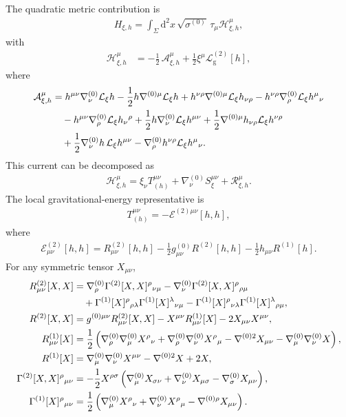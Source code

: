 \documentclass[11pt]{article}
\newcommand{\dd}{\mathrm{d}}
\newcommand{\Lg}{\mathcal{L}_{\mathrm g}}
\newcommand{\cH}{\mathcal{H}}
\newcommand{\cE}{\mathcal{E}}
\newcommand{\cR}{\mathcal{R}}
\newcommand{\Lie}{\mathcal{L}}
\begin{document}
The quadratic metric contribution is
\begin{align}
  H_{\xi,h}
  =\int_\Sigma\dd^2x\,\sqrt{\sigma^{(0)}}\,
    \tau_\mu\cH^\mu_{\xi,h},
\end{align}
with
\begin{align}
  \cH^\mu_{\xi,h}
  &=-\frac12\,\mathcal{A}^\mu_{\xi,h}
    +\frac12\xi^\mu\Lg^{(2)}[h],
\end{align}
where
\begin{align}
  \mathcal{A}^\mu_{\xi,h}
  &=h^{\mu\nu}\nabla^{(0)}_\nu\Lie_\xi h
    -\frac12h\nabla^{(0)\mu}\Lie_\xi h
    +h^{\nu\rho}\nabla^{(0)\mu}\Lie_\xi h_{\nu\rho}
    -h^{\nu\rho}\nabla^{(0)}_\rho\Lie_\xi h^\mu{}_\nu
    \notag\\
  &\quad
    -h^{\mu\nu}\nabla^{(0)}_\rho\Lie_\xi h_\nu{}^\rho
    +\frac12h\nabla^{(0)}_\nu\Lie_\xi h^{\mu\nu}
    +\frac12\nabla^{(0)\mu}h_{\nu\rho}\Lie_\xi h^{\nu\rho}
    \notag\\
  &\quad
    +\frac12\nabla^{(0)}_\nu h\,\Lie_\xi h^{\mu\nu}
    -\nabla^{(0)}_\rho h^{\nu\rho}\Lie_\xi h^\mu{}_\nu .
\end{align}
This current can be decomposed as
\begin{align}
  \cH^\mu_{\xi,h}
  =\xi_\nu T_{(h)}^{\mu\nu}
    +\nabla^{(0)}_\nu S_\xi^{\mu\nu}
    +\cR^\mu_{\xi,h}.
\end{align}
The local gravitational-energy representative is
\begin{align}
  T_{(h)}^{\mu\nu}=-\cE^{(2)\mu\nu}[h,h],
\end{align}
where
\begin{align}
  \cE_{\mu\nu}^{(2)}[h,h]
  =R_{\mu\nu}^{(2)}[h,h]
   -\frac12g^{(0)}_{\mu\nu}R^{(2)}[h,h]
   -\frac12h_{\mu\nu}R^{(1)}[h].
\end{align}
For any symmetric tensor $X_{\mu\nu}$,
\begin{align}
  R_{\mu\nu}^{(2)}[X,X]
  &=\nabla^{(0)}_\rho\Gamma^{(2)}[X,X]^\rho{}_{\nu\mu}
    -\nabla^{(0)}_\nu\Gamma^{(2)}[X,X]^\rho{}_{\rho\mu}
    \notag\\
  &\quad
    +\Gamma^{(1)}[X]^\rho{}_{\rho\lambda}
      \Gamma^{(1)}[X]^\lambda{}_{\nu\mu}
    -\Gamma^{(1)}[X]^\rho{}_{\nu\lambda}
      \Gamma^{(1)}[X]^\lambda{}_{\rho\mu},\\
  R^{(2)}[X,X]
  &=g^{(0)\mu\nu}R_{\mu\nu}^{(2)}[X,X]
    -X^{\mu\nu}R_{\mu\nu}^{(1)}[X]
    -2X_{\mu\nu}X^{\mu\nu},\\
  R_{\mu\nu}^{(1)}[X]
  &=\frac12\left(
    \nabla^{(0)}_\rho\nabla^{(0)}_\mu X^\rho{}_\nu
    +\nabla^{(0)}_\rho\nabla^{(0)}_\nu X^\rho{}_\mu
    -\nabla^{(0)2}X_{\mu\nu}
    -\nabla^{(0)}_\mu\nabla^{(0)}_\nu X
    \right),\\
  R^{(1)}[X]
  &=\nabla^{(0)}_\mu\nabla^{(0)}_\nu X^{\mu\nu}
    -\nabla^{(0)2}X+2X,\\
  \Gamma^{(2)}[X,X]^\rho{}_{\mu\nu}
  &=-\frac12X^{\rho\sigma}
    \left(
      \nabla^{(0)}_\mu X_{\sigma\nu}
      +\nabla^{(0)}_\nu X_{\mu\sigma}
      -\nabla^{(0)}_\sigma X_{\mu\nu}
    \right),\\
  \Gamma^{(1)}[X]^\rho{}_{\mu\nu}
  &=\frac12\left(
    \nabla^{(0)}_\mu X^\rho{}_\nu
    +\nabla^{(0)}_\nu X^\rho{}_\mu
    -\nabla^{(0)\rho}X_{\mu\nu}
  \right).
\end{align}
\end{document}
